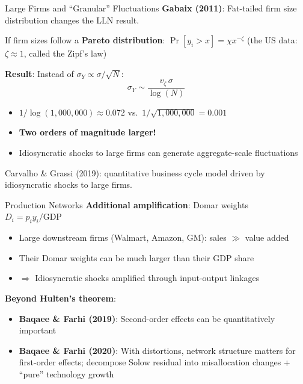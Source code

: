 \documentclass[blue]{beamer}
\begin{document}
\begin{frame}{Large Firms and ``Granular'' Fluctuations}
	\textbf{Gabaix (2011)}: Fat-tailed firm size distribution changes the LLN result.
	
	\medskip
	If firm sizes follow a \textbf{Pareto distribution}: $\Pr[y_i > x] = \chi x^{-\zeta}$ (the US data: $\zeta \approx 1$, called the Zipf's law)

	\medskip
	\textbf{Result}: Instead of $\sigma_Y \propto \sigma / \sqrt{N}$:
	\[
	\sigma_Y \sim \frac{v_\zeta \, \sigma}{\log(N)}
	\]
	\vspace{-20pt}
	\begin{itemize}
		\item $1/\log(1{,}000{,}000) \approx 0.072$ vs.\ $1/\sqrt{1{,}000{,}000} = 0.001$
		\item \textbf{Two orders of magnitude larger!}
		\item Idiosyncratic shocks to large firms can generate aggregate-scale fluctuations
	\end{itemize}
	
	\medskip
	Carvalho \& Grassi (2019): quantitative business cycle model driven by idiosyncratic shocks to large firms.
\end{frame}

\begin{frame}{Production Networks}
	\textbf{Additional amplification}: Domar weights $D_i = p_i y_i / \text{GDP}$
	
	\begin{itemize}
		\item Large downstream firms (Walmart, Amazon, GM): sales $\gg$ value added
		\item Their Domar weights can be much larger than their GDP share
		\item $\Rightarrow$ Idiosyncratic shocks amplified through input-output linkages
	\end{itemize}
	
	\bigskip
	\textbf{Beyond Hulten's theorem}:
	\begin{itemize}
		\item \textbf{Baqaee \& Farhi (2019)}: Second-order effects can be quantitatively important
		\item \textbf{Baqaee \& Farhi (2020)}: With distortions, network structure matters for first-order effects; decompose Solow residual into misallocation changes + ``pure'' technology growth
	\end{itemize}
\end{frame}
\end{document}
